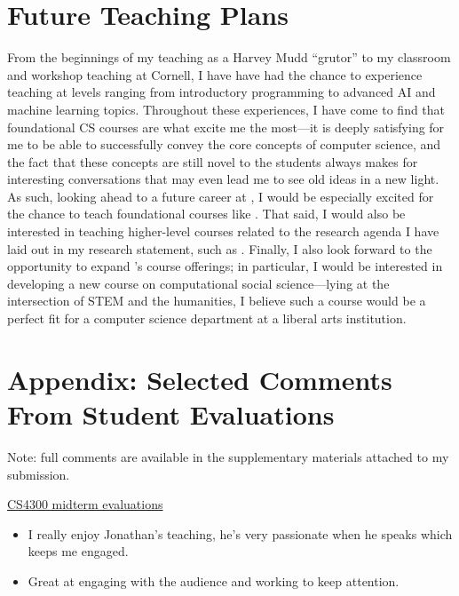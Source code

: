 \documentclass[12pt,letterpaper]{article}
\begin{document}
\section{Future Teaching Plans}
From the beginnings of my teaching as a Harvey Mudd ``grutor'' to my classroom and workshop teaching at Cornell, I have have had the chance to experience teaching at levels ranging from introductory programming to advanced AI and machine learning topics.
Throughout these experiences, I have come to find that foundational CS courses are what excite me the most---it is deeply satisfying for me to be able to successfully convey the core concepts of computer science, and the fact that these concepts are still novel to the students always makes for interesting conversations that may even lead me to see old ideas in a new light.
As such, looking ahead to a future career at \schoolname, I would be especially excited for the chance to teach foundational courses like \schoolintrocourses.
That said, I would also be interested in teaching higher-level courses related to the research agenda I have laid out in my research statement, such as \schooladvcourses.
Finally, I also look forward to the opportunity to expand \schoolname's course offerings; in particular, I would be interested in developing a new course on computational social science---lying at the intersection of STEM and the humanities, I believe such a course would be a perfect fit for a computer science department at a liberal arts institution.


\ifappendix
\vspace{\baselineskip}
\section{Appendix: Selected Comments From Student Evaluations}
Note: full comments are available in the supplementary materials attached to my submission.


\noindent\underline{CS4300 midterm evaluations}
\begin{itemize}
    \item I really enjoy Jonathan's teaching, he's very passionate when he speaks which keeps me engaged.
    \item Great at engaging with the audience and working to keep attention.
\end{itemize}
\end{document}
